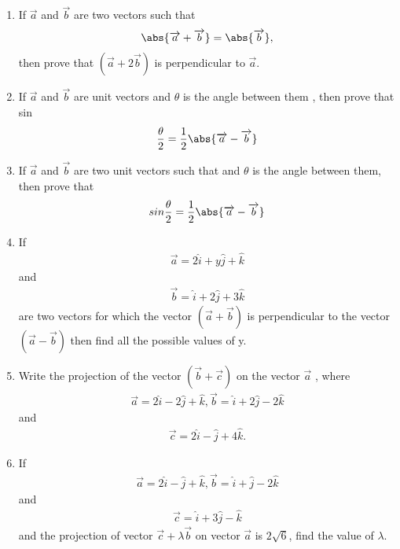 \begin{enumerate}
\item  If $\overrightarrow{ a}$  and  $\overrightarrow{b}$  are two vectors such that \begin{align}\abs{\overrightarrow{a} + \overrightarrow{b}} = \abs{ \overrightarrow{b}},\end{align}then prove that $(\overrightarrow{a} + 2\overrightarrow{b})$  is perpendicular to $\overrightarrow{ a}$.
\item If $\overrightarrow{ a}$ and $\overrightarrow{ b}$ are unit vectors and $\theta$ is the angle between them , then prove that sin \begin{align}\frac{\theta}{ 2} = \frac{1}{2}\abs{\overrightarrow{ a} - \overrightarrow{ b}}\end{align}
\item If $\overrightarrow{a}$ and $\overrightarrow{b}$  are two unit vectors such that and $\theta$ is the angle between them, then prove that                       \begin{align}sin \dfrac{ \theta}{2} = \frac{1}{2} \abs{\overrightarrow{a} - \overrightarrow{b}} \end{align} 
\item If \begin{align}\overrightarrow{a} = 2\hat{i} + y\hat{j} + \hat{ k}\end{align} and \begin{align}\overrightarrow{ b} = \hat{i} + 2\hat{j}+ 3\hat{k}\end{align} are two vectors for which the vector $(\overrightarrow{a}+\overrightarrow{b})$ is perpendicular to the vector  $(\overrightarrow{a}-\overrightarrow{b})$ then find all the possible values of y.
\item Write the projection of the vector $(\overrightarrow{b}+\overrightarrow{c})$  on the vector  $\overrightarrow{a}$ ,  where \begin{align}\overrightarrow{ a} = 2\hat{i}-2\hat{j}+\hat{k}, \overrightarrow{b} = \hat{i}+2\hat{j}-2\hat{k}\end{align} and \begin{align}\overrightarrow{c} = 2\hat{i}-\hat{j}+4\hat{k}.\end{align}
\item If \begin{align}\overrightarrow{ a } = 2\hat{i} - \hat{ j } +\hat{ k }, \overrightarrow{ b } = \hat{ i } + \hat{ j} - 2\hat{ k }\end{align} and  \begin{align}\overrightarrow{ c } = \hat{ i } +3\hat{j} - \hat{k}\end{align} and the projection of vector   $\overrightarrow{c} + \lambda \overrightarrow{b}$  on  vector  $\overrightarrow{a}$  is $2\sqrt{6}$, find the value of $\lambda$.

\end{enumerate}
